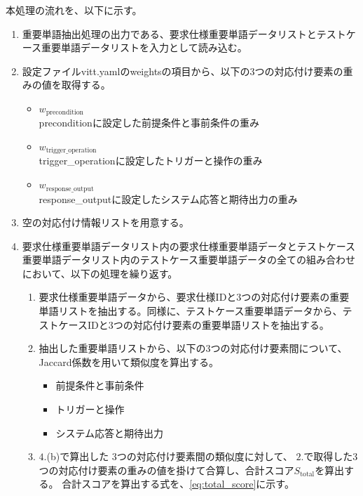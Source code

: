 本処理の流れを、以下に示す。
\begin{enumerate}
    \item 重要単語抽出処理の出力である、要求仕様重要単語データリストとテストケース重要単語データリストを入力として読み込む。
    \item 設定ファイルvitt.yamlのweightsの項目から、以下の3つの対応付け要素の重みの値を取得する。       
    \begin{itemize}                                                                           
        \item $w_{\text{precondition}}$\\
        preconditionに設定した前提条件と事前条件の重み                                          
        \item $w_{\text{trigger\_operation}}$\\
        trigger\_operationに設定したトリガーと操作の重み                                        
        \item $w_{\text{response\_output}}$\\
        response\_outputに設定したシステム応答と期待出力の重み                                  
    \end{itemize}
    \item 空の対応付け情報リストを用意する。
    \item 要求仕様重要単語データリスト内の要求仕様重要単語データとテストケース重要単語データリスト内のテストケース重要単語データの全ての組み合わせにおいて、以下の処理を繰り返す。
    \begin{enumerate}
        \item 要求仕様重要単語データから、要求仕様IDと$3$つの対応付け要素の重要単語リストを抽出する。同様に、テストケース重要単語データから、テストケースIDと$3$つの対応付け要素の重要単語リストを抽出する。
        \item 抽出した重要単語リストから、以下の$3$つの対応付け要素間について、Jaccard係数を用いて類似度を算出する。
        \begin{itemize}
            \item 前提条件と事前条件
            \item トリガーと操作
            \item システム応答と期待出力
        \end{itemize}
        \item $4$.(b)で算出した $3$つの対応付け要素間の類似度に対して、
        $2$.で取得した3つの対応付け要素の重みの値を掛けて合算し、合計スコア$S_{\text{total}}$を算出する。
        合計スコアを算出する式を、\cref{eq:total_score}に示す。


\end{enumerate}
\end{enumerate}
